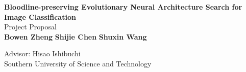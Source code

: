 \documentclass{article}
\begin{document}
	\begin{center}
    
    
		\LARGE{\textbf{Bloodline-preserving Evolutionary Neural Architecture Search for Image Classification}} \\
        \vspace{1em}
        \Large{Project Proposal} \\
        \vspace{1em}
        \normalsize\textbf{ Bowen Zheng   }  
        \normalsize\textbf{ Shijie Chen   } 
        \normalsize\textbf{ Shuxin Wang  } 
        
        \vspace{1em}
        \normalsize{Advisor: Hisao Ishibuchi} \\
        \vspace{1em}
        \normalsize{Southern University of Science and Technology} 
	\end{center}
\end{document}
